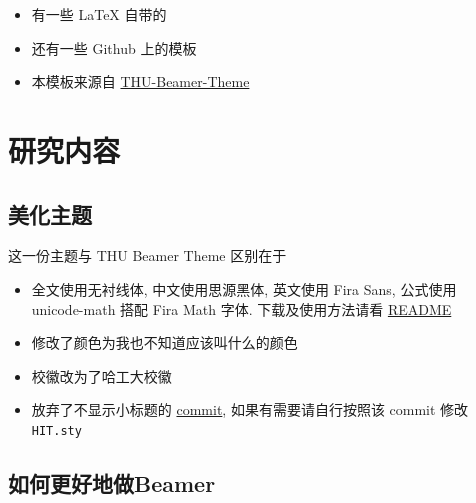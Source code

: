\documentclass{beamer}
\begin{document}
\begin{frame}
    \begin{itemize}
        \item 有一些 \LaTeX{} 自带的
        \item 还有一些 Github 上的模板
        \item 本模板来源自 \href{https://www.latexstudio.net/archives/4051.html}{THU-Beamer-Theme}
    \end{itemize}
\end{frame}


\section{研究内容}

\subsection{美化主题}

\begin{frame}{这一份主题与 THU Beamer Theme 区别在于}
    \begin{itemize}
        \item 全文使用无衬线体, 中文使用思源黑体, 英文使用 Fira Sans, 公式使用 unicode-math 搭配 Fira Math 字体. 下载及使用方法请看  \href{https://github.com/syvshc/HITBeamer\#readme}{README}
        \item 修改了颜色为我也不知道应该叫什么的颜色
        \item 校徽改为了哈工大校徽
        \item 放弃了不显示小标题的 \href{https://github.com/Trinkle23897/THU-Beamer-Theme/commit/061f088d1c7e4b2d2f1f581f3745945ecbb63f25}{commit}, 如果有需要请自行按照该 commit 修改 \texttt{HIT.sty}
    \end{itemize}
\end{frame}

\subsection{如何更好地做Beamer}
\end{document}
